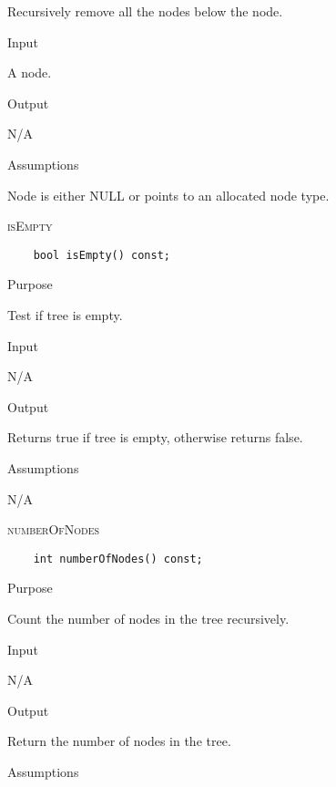 \documentclass[pdftex, 12pt]{article}
\begin{document}
\begin{description}
\begin{description}
				Recursively remove all the nodes below the node.
			
			\item{Input}
			
				A node.

			\item{Output}

				N/A

			\item{Assumptions}

				Node is either NULL or points to an allocated node type.

		\end{description}
	\item{\textsc{isEmpty}}
\begin{lstlisting}
	bool isEmpty() const;
\end{lstlisting}
		\begin{description}

			\item{Purpose}

				Test if tree is empty.

			\item{Input}

				N/A

			\item{Output}

				Returns true if tree is empty, otherwise returns false.

			\item{Assumptions}

				N/A

		\end{description}
	\item{\textsc{numberOfNodes}}
\begin{lstlisting}
	int numberOfNodes() const;
\end{lstlisting}
		\begin{description}

			\item{Purpose}

				Count the number of nodes in the tree recursively.

			\item{Input}

				N/A

			\item{Output}

				Return the number of nodes in the tree.

			\item{Assumptions}


\end{description}
\end{description}
\end{document}
